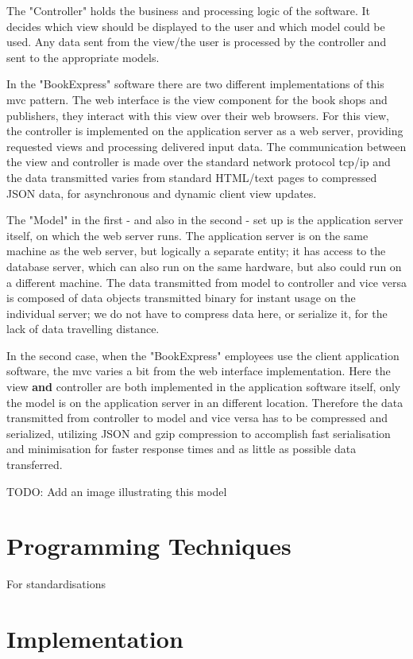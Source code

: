 \documentclass[11pt,a4paper,oneside,svgnames]{report}
\begin{document}
The "Controller" holds the business and processing logic of the software. It decides which view should be displayed to the user and which model could be used. Any data sent from the view/the user is processed by the controller and sent to the appropriate models.

In the "BookExpress" software there are two different implementations of this \gls{mvc} pattern. The web interface is the view component for the book shops and publishers, they interact with this view over their web browsers.
For this view, the controller is implemented on the application server as a web server, providing requested views and processing delivered input data. The communication between the view and controller is made over the standard network protocol tcp/ip and the data transmitted varies from standard HTML/text pages to compressed JSON data, for asynchronous and dynamic client view updates.

The "Model" in the first - and also in the second - set up is the application server itself, on which the web server runs. The application server is on the same machine as the web server, but logically a separate entity; it has access to the database server, which can also run on the same hardware, but also could run on a different machine. The data transmitted from model to controller and vice versa is composed of data objects transmitted binary for instant usage on the individual server; we do not have to compress data here, or serialize it, for the lack of data travelling distance.

In the second case, when the "BookExpress" employees use the client application software, the \gls{mvc} varies a bit from the web interface implementation. Here the view \textbf{and} controller are both implemented in the application software itself, only the model is on the application server in an different location. Therefore the data transmitted from controller to model and vice versa has to be compressed and serialized, utilizing JSON and gzip compression to accomplish fast serialisation and minimisation for faster response times and as little as possible data transferred.

TODO: Add an image illustrating this model

\section{Programming Techniques}
For standardisations 

\section{Implementation}
\end{document}
